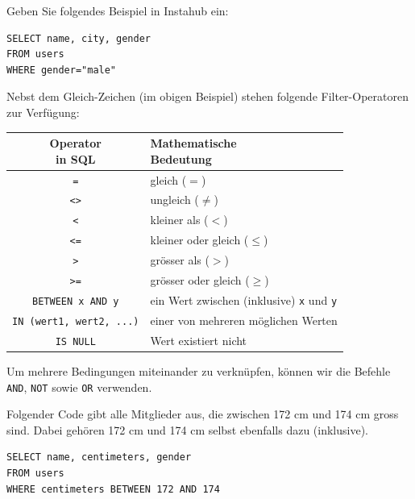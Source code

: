 \begin{myexample}
Geben Sie folgendes Beispiel in Instahub ein:

\begin{lstlisting}
SELECT name, city, gender
FROM users
WHERE gender="male"
\end{lstlisting}
\end{myexample}

Nebst dem Gleich-Zeichen (im obigen Beispiel) stehen folgende Filter-Operatoren zur Verfügung:
\begin{table}[H]
  \centering
  \begin{tabular}{c|l}
    \makecell{\textbf{Operator}                                                                 \\\textbf{in \gls{SQL}}} & \makecell{\textbf{Mathematische}\\\textbf{Bedeutung}} \\\midrule
    \texttt{=}                                    & gleich ($=$)                                \\
    \texttt{<>}                                   & ungleich ($\neq$)                           \\
    \texttt{<}                                    & kleiner als ($<$)                           \\
    \texttt{<=}                                   & kleiner oder gleich ($\leq$)                \\
    \texttt{>}                                    & grösser als ($>$)                           \\
    \texttt{>=}                                   & grösser oder gleich ($\geq$)                \\
    \lstinline|BETWEEN x AND y|        & ein Wert zwischen (inklusive) \texttt{x} und \texttt{y} \\
    \lstinline|IN (wert1, wert2, ...)| & einer von mehreren möglichen Werten         \\
    \lstinline|IS NULL|                & Wert existiert nicht                        \\
  \end{tabular}
\end{table}
Um mehrere Bedingungen miteinander zu verknüpfen, können wir die Befehle \lstinline|AND|, \lstinline|NOT| sowie \lstinline|OR| verwenden.

\begin{myexample}\label{myexample:between}
Folgender Code gibt alle Mitglieder aus, die zwischen 172 cm und 174 cm gross sind. Dabei gehören 172 cm und 174 cm selbst ebenfalls dazu (inklusive).

\begin{lstlisting}
SELECT name, centimeters, gender 
FROM users 
WHERE centimeters BETWEEN 172 AND 174 
\end{lstlisting}
\end{myexample}

